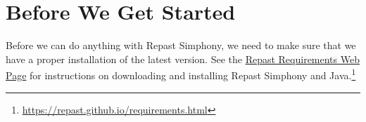 
\section{Before We Get Started}
Before we can do anything with Repast Simphony, we need to make sure that we have a proper installation
of the latest version. See the \href{https://repast.github.io/requirements.html}{Repast Requirements
Web Page} for instructions on downloading and installing Repast Simphony and Java.\footnote
{ \href{https://repast.github.io/requirements.html}{https://repast.github.io/requirements.html} }
